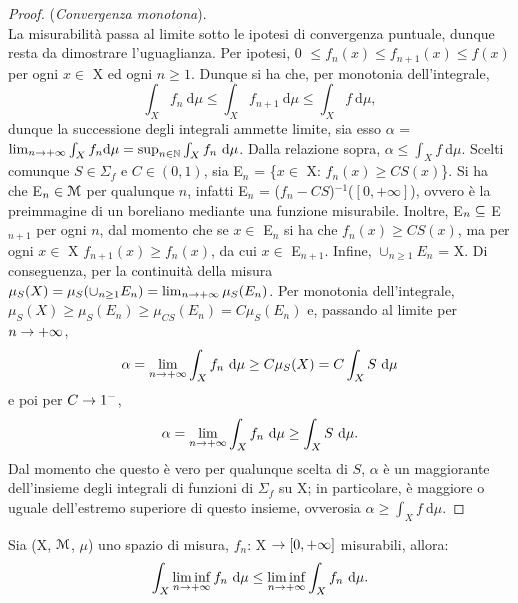 \documentclass[Completo.tex]{subfiles}
\begin{document}
	\begin{proof}
		(\textit{Convergenza monotona}). \\
		La misurabilità passa al limite sotto le ipotesi di convergenza puntuale, dunque resta da dimostrare l'uguaglianza. Per ipotesi, 0 $\leq f_n(x) \leq f_{n+1}(x) \leq f(x)$ per ogni $x \in$ X ed ogni $n \geq 1$. Dunque si ha che, per monotonia dell'integrale,
		\begin{equation*}
		\int_X f_n \ \mathrm{d}\mu \leq \int_X f_{n+1} \ \mathrm{d}\mu \leq \int_X f \ \mathrm{d}\mu,
		\end{equation*}
		dunque la successione degli integrali ammette limite, sia esso $\alpha$ = $\lim_{n \ra +\infty} \int_X f_n \mathrm{d}\mu = \sup_{n \in \bb[N]} \int_X f_n \ \mathrm{d}\mu$. Dalla relazione sopra, $\alpha \leq \int_X f \ \mathrm{d}\mu$. Scelti comunque $S \in \Sigma_f$ e $C \in (0,1)$, sia E$_n$ = \{$x \in$ X: $f_n(x) \geq CS(x)$\}. Si ha che E$_n \in \eu[M]$ per qualunque $n$, infatti E$_n$ = ($f_n - CS$)$^{-1}$($[0, +\infty]$), ovvero è la preimmagine di un boreliano mediante una funzione misurabile. Inoltre, E$_n \subseteq$ E$_{n+1}$ per ogni $n$, dal momento che se $x \in$ E$_n$ si ha che $f_n(x) \geq CS(x)$, ma per ogni $x \in$ X $f_{n+1}(x) \geq f_n(x)$, da cui $x \in$ E$_{n+1}$. Infine, $\cup_{n\geq1} E_n$ = X. Di conseguenza, per la continuità della misura $\mu_S(X) = \mu_S(\cup_{n\geq1}E_n) = \lim_{n \rightarrow +\infty} \mu_S(E_n)$. Per monotonia dell'integrale, $\mu_S(X) \geq \mu_S(E_n) \geq \mu_{CS}(E_n) = C\mu_S(E_n)$ e, passando al limite per $n \rightarrow +\infty$,
		\begin{equation*}
		\alpha = \lim_{n \ra +\infty} \int_X f_n \ \mathrm{d}\mu \geq C \mu_S(X) = C \int_X S \ \mathrm{d}\mu
		\end{equation*}
		e poi per $C \rightarrow 1^{-}$,
		\begin{equation*}
		\alpha = \lim_{n \ra +\infty} \int_X f_n \ \mathrm{d}\mu \geq \int_X S \ \mathrm{d}\mu.
		\end{equation*}
		Dal momento che questo è vero per qualunque scelta di $S$, $\alpha$ è un maggiorante dell'insieme degli integrali di funzioni di $\Sigma_f$ su X; in particolare, è maggiore o uguale dell'estremo superiore di questo insieme, ovverosia $\alpha \geq \int_X f \ \mathrm{d}\mu$.
	\end{proof}
	\begin{eTh}[Fatou]
		Sia (X, $\eu[M]$, $\mu$) uno spazio di misura, $f_n$: X $\rightarrow [0, +\infty]$ misurabili, allora:
		\begin{equation*}
		\int_X \liminf_{n \ra +\infty} f_n \ \mathrm{d}\mu \leq \liminf_{n \ra +\infty} \int_X f_n \ \mathrm{d}\mu.
		\end{equation*}
	\end{eTh}
\end{document}
